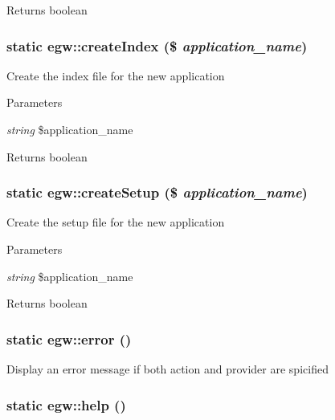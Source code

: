 \begin{DoxyReturn}{Returns}
boolean 
\end{DoxyReturn}
\hypertarget{classegw_afe2fbca78672c8b7359aaee7ad2951b3}{
\subsubsection[{createIndex}]{\setlength{\rightskip}{0pt plus 5cm}static egw::createIndex (\$ {\em application\_\-name})}}
\label{classegw_afe2fbca78672c8b7359aaee7ad2951b3}
Create the index file for the new application 
\begin{DoxyParams}{Parameters}
\item[{\em string}]\$application\_\-name \end{DoxyParams}
\begin{DoxyReturn}{Returns}
boolean 
\end{DoxyReturn}
\hypertarget{classegw_a5875fbc00fd0375ba6c8daf923da1a26}{
\subsubsection[{createSetup}]{\setlength{\rightskip}{0pt plus 5cm}static egw::createSetup (\$ {\em application\_\-name})}}
\label{classegw_a5875fbc00fd0375ba6c8daf923da1a26}
Create the setup file for the new application 
\begin{DoxyParams}{Parameters}
\item[{\em string}]\$application\_\-name \end{DoxyParams}
\begin{DoxyReturn}{Returns}
boolean 
\end{DoxyReturn}
\hypertarget{classegw_a4b57da58420cc69c3f68716cfed1c000}{
\subsubsection[{error}]{\setlength{\rightskip}{0pt plus 5cm}static egw::error ()}}
\label{classegw_a4b57da58420cc69c3f68716cfed1c000}
Display an error message if both action and provider are spicified \hypertarget{classegw_ac70cba8b05c8c26992fc0d88593ee619}{
\subsubsection[{help}]{\setlength{\rightskip}{0pt plus 5cm}static egw::help ()}}
